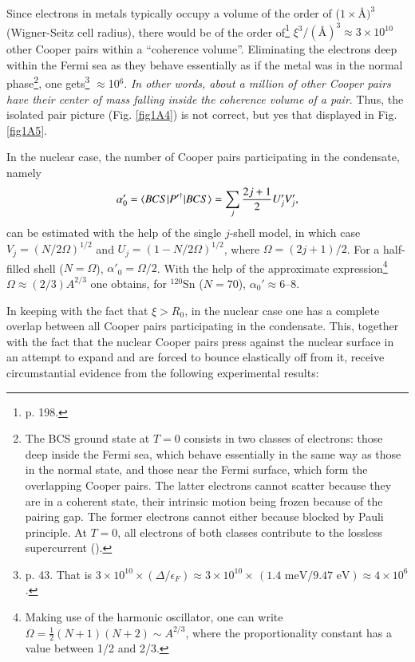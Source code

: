 Since electrons in metals typically occupy a volume of the order of ($1\times$\AA$)^3$ (Wigner-Seitz cell radius), there would be of the order of\footnote{\cite{Ketterson:99} p. 198.} $\xi^3/(\text{\AA})^3\approx 3\times10^{10}$ other Cooper pairs within a ``coherence volume''. Eliminating the electrons deep within the Fermi sea as they behave essentially as if the metal was in the normal phase\footnote{The BCS ground state at $T=0$ consists in two classes of electrons: those deep inside the Fermi sea, which behave essentially in the same way as those in the normal state, and those near the Fermi surface, which form the overlapping Cooper pairs. The latter electrons cannot scatter because they are in a coherent state, their intrinsic motion being frozen because of the pairing gap. The former electrons  cannot either because  blocked by Pauli principle. At $T=0$, all electrons of both classes contribute to the lossless supercurrent (\cite{Waldram:96}).}, one gets\footnote{\cite{Schrieffer:64} p. 43.  That is $3\times10^{10}\times(\Delta/\epsilon_F)\approx3\times10^{10}\times\,(1.4\text{ meV}/9.47\text{ eV})\approx 4\times 10^{6}$.} $\approx$10$^6$. \textit{In other words, about a million of other Cooper pairs have their center of mass falling inside the coherence volume of a pair}. Thus, the isolated pair picture (Fig. \ref{fig1A4}) is not correct, but yes that displayed in Fig. \ref{fig1A5}.





 


 In the nuclear case, the number of Cooper pairs participating in the condensate, namely 
 \begin{align}\label{eq3B11}
\alpha'_0=\langle {BCS|P'^\dagger|BCS} \rangle=\sum_j\frac{2j+1}{2}U'_jV'_j,
 \end{align}
 can be estimated  with the help of the single $j$-shell model, in which case $V_j=(N/2\Omega)^{1/2}$ and $U_j=(1-N/2\Omega)^{1/2}$, where $\Omega=(2j+1)/2$. For a half-filled shell ($N=\Omega$),  $\alpha'_0=\Omega/2$. With the help of the approximate expression\footnote{Making use of the harmonic oscillator, one can write $\Omega=\frac{1}{2}(N+1)(N+2)\sim A^{2/3}$, where the proportionality constant has a value between 1/2 and 2/3.} $\Omega\approx(2/3)A^{2/3}$ one obtains, for $^{120}$Sn ($N=70$), $\alpha_0'\approx6$--8.
 
 
 In keeping with the fact that $\xi>R_0$, in the nuclear case one has a complete overlap between all Cooper pairs participating in the condensate. This, together with the fact that the nuclear Cooper pairs press against the nuclear surface in an attempt to expand and are forced to bounce elastically off from  it, receive  circumstantial evidence from the following experimental results:
 
